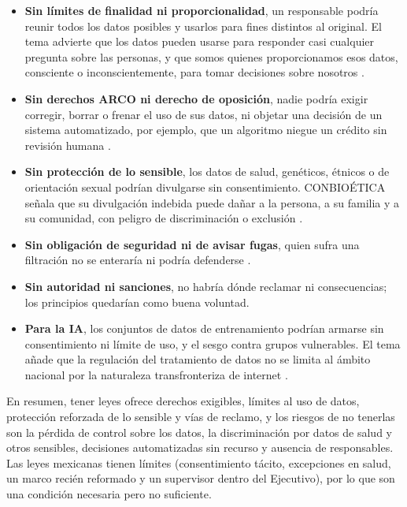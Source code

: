 \documentclass[11pt,letterpaper]{article}
\begin{document}
\begin{itemize}
    \item \textbf{Sin límites de finalidad ni proporcionalidad}, un responsable podría reunir todos los datos posibles y usarlos para fines distintos al original. El tema advierte que los datos pueden usarse para responder casi cualquier pregunta sobre las personas, y que somos quienes proporcionamos esos datos, consciente o inconscientemente, para tomar decisiones sobre nosotros \parencite{iae_u6_t61}.
    \item \textbf{Sin derechos ARCO ni derecho de oposición}, nadie podría exigir corregir, borrar o frenar el uso de sus datos, ni objetar una decisión de un sistema automatizado, por ejemplo, que un algoritmo niegue un crédito sin revisión humana \parencite{iae_u6_t61}.
    \item \textbf{Sin protección de lo sensible}, los datos de salud, genéticos, étnicos o de orientación sexual podrían divulgarse sin consentimiento. CONBIOÉTICA señala que su divulgación indebida puede dañar a la persona, a su familia y a su comunidad, con peligro de discriminación o exclusión \parencite{conbioetica2014}.
    \item \textbf{Sin obligación de seguridad ni de avisar fugas}, quien sufra una filtración no se enteraría ni podría defenderse \parencite[art.~19]{lfpdppp2025}.
    \item \textbf{Sin autoridad ni sanciones}, no habría dónde reclamar ni consecuencias; los principios quedarían como buena voluntad.
    \item \textbf{Para la IA}, los conjuntos de datos de entrenamiento podrían armarse sin consentimiento ni límite de uso, y el sesgo contra grupos vulnerables. El tema añade que la regulación del tratamiento de datos no se limita al ámbito nacional por la naturaleza transfronteriza de internet \parencite{iae_u6_t61}.
\end{itemize}

En resumen, tener leyes ofrece derechos exigibles, límites al uso de datos, protección reforzada de lo sensible y vías de reclamo, y los riesgos de no tenerlas son la pérdida de control sobre los datos, la discriminación por datos de salud y otros sensibles, decisiones automatizadas sin recurso y ausencia de responsables. Las leyes mexicanas tienen límites (consentimiento tácito, excepciones en salud, un marco recién reformado y un supervisor dentro del Ejecutivo), por lo que son una condición necesaria pero no suficiente.

\end{document}
